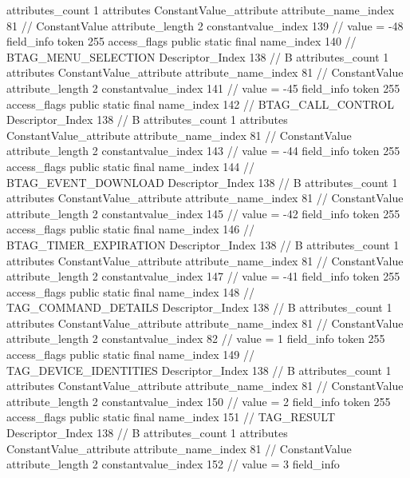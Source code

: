 {{{{{				attributes_count	1
				attributes {
				ConstantValue_attribute {
					attribute_name_index	81		// ConstantValue
					attribute_length	2
					constantvalue_index	139		// value = -48
				}
				}
			}
			field_info {
				token	255
				access_flags	public static final
				name_index	140		// BTAG_MENU_SELECTION
				Descriptor_Index	138		// B
				attributes_count	1
				attributes {
				ConstantValue_attribute {
					attribute_name_index	81		// ConstantValue
					attribute_length	2
					constantvalue_index	141		// value = -45
				}
				}
			}
			field_info {
				token	255
				access_flags	public static final
				name_index	142		// BTAG_CALL_CONTROL
				Descriptor_Index	138		// B
				attributes_count	1
				attributes {
				ConstantValue_attribute {
					attribute_name_index	81		// ConstantValue
					attribute_length	2
					constantvalue_index	143		// value = -44
				}
				}
			}
			field_info {
				token	255
				access_flags	public static final
				name_index	144		// BTAG_EVENT_DOWNLOAD
				Descriptor_Index	138		// B
				attributes_count	1
				attributes {
				ConstantValue_attribute {
					attribute_name_index	81		// ConstantValue
					attribute_length	2
					constantvalue_index	145		// value = -42
				}
				}
			}
			field_info {
				token	255
				access_flags	public static final
				name_index	146		// BTAG_TIMER_EXPIRATION
				Descriptor_Index	138		// B
				attributes_count	1
				attributes {
				ConstantValue_attribute {
					attribute_name_index	81		// ConstantValue
					attribute_length	2
					constantvalue_index	147		// value = -41
				}
				}
			}
			field_info {
				token	255
				access_flags	public static final
				name_index	148		// TAG_COMMAND_DETAILS
				Descriptor_Index	138		// B
				attributes_count	1
				attributes {
				ConstantValue_attribute {
					attribute_name_index	81		// ConstantValue
					attribute_length	2
					constantvalue_index	82		// value = 1
				}
				}
			}
			field_info {
				token	255
				access_flags	public static final
				name_index	149		// TAG_DEVICE_IDENTITIES
				Descriptor_Index	138		// B
				attributes_count	1
				attributes {
				ConstantValue_attribute {
					attribute_name_index	81		// ConstantValue
					attribute_length	2
					constantvalue_index	150		// value = 2
				}
				}
			}
			field_info {
				token	255
				access_flags	public static final
				name_index	151		// TAG_RESULT
				Descriptor_Index	138		// B
				attributes_count	1
				attributes {
				ConstantValue_attribute {
					attribute_name_index	81		// ConstantValue
					attribute_length	2
					constantvalue_index	152		// value = 3
				}
				}
			}
			field_info {
}}}}}
